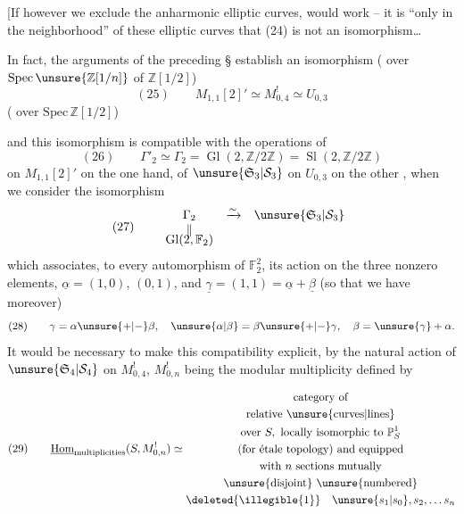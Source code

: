 [If however we exclude the anharmonic elliptic curves,  would work -- it is ``only in the neighborhood'' of these elliptic curves that (24) is not an isomorphism\ldots


In fact, the arguments of the preceding \S{} establish an isomorphism ( over  $\mathrm{Spec}\,\unsure{\mathbb Z[1/n]}$ of $\mathbb Z[1/2]$)
\[
(25)\qquad M_{1,1}[2]'\simeq M_{0,4}^{!}\simeq U_{0,3}
\]
( over $\mathrm{Spec}\,\mathbb Z[1/2]$)


and this isomorphism is compatible with the operations of 
\[
(26)\qquad \Gamma'_2\simeq\Gamma_2=\operatorname{Gl}(2,\mathbb Z/2\mathbb Z)=\operatorname{Sl}(2,\mathbb Z/2\mathbb Z)
\]
on $M_{1,1}[2]'$ on the one hand, of $\unsure{\mathfrak S_3|\mathcal S_3}$ on $U_{0,3}$ on the other , when we consider the isomorphism
\[
(27)\qquad
\begin{array}{ccc}
\Gamma_2 & \xrightarrow{\sim} & \unsure{\mathfrak S_3|\mathcal S_3}\\
\Vert &&\\[-4pt]
\operatorname{Gl}(2,\mathbb F_2)&&
\end{array}
\]
which associates, to every automorphism of $\mathbb F_2^2$, its action on the three nonzero elements, $\underline{\alpha}=(1,0)$, \inserted{$\underline{\beta}=$}$(0,1)$, and $\underline{\gamma}=(1,1)=\underline{\alpha}+\underline{\beta}$ (so that we have moreover) 
\[
(28)\qquad \gamma=\alpha\unsure{+|-}\beta,\quad \unsure{\alpha|\beta}=\beta\unsure{+|-}\gamma,\quad \beta=\unsure{\gamma}+\alpha.
\]
It would be necessary to make this compatibility explicit, by  the natural action of $\unsure{\mathfrak S_4|\mathcal S_4}$ on $M_{0,4}^{!}$, $M_{0,n}^{!}$ being the modular multiplicity defined by


\[
(29)\qquad
\underline{\operatorname{Hom}}_{\text{multiplicities}}(S,M_{0,n}^{!})\simeq
\begin{gathered}
\text{category of}\\
\text{relative \unsure{curves|lines}}\\
\text{over }S,\ \text{locally isomorphic to }\mathbb P^1_S\\
\text{(for étale topology) and equipped}\\
\text{with }n\text{ sections mutually}\\
\text{\unsure{disjoint} \unsure{numbered}}\\
\deleted{\illegible{1}}\quad\unsure{s_1|s_0},s_2,\ldots s_n
\end{gathered}
\]

